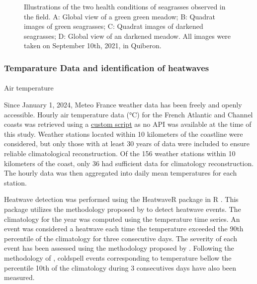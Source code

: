 \documentclass[
  number]{elsarticle}
\makeatletter
\let\oldparagraph\paragraph
\renewcommand{\paragraph}{
    \@ifstar
      \xxxParagraphStar
      \xxxParagraphNoStar
  }
\newcommand{\xxxParagraphStar}[1]{\oldparagraph*{#1}\mbox{}}
\newcommand{\xxxParagraphNoStar}[1]{\oldparagraph{#1}\mbox{}}
\makeatother
\begin{document}
\label{cell-fig-QuiberonImg}
\begin{figure}[H]


\caption{\label{fig-QuiberonImg}Illustrations of the two health
conditions of seagrasses observed in the field. A: Global view of a
green green meadow; B: Quadrat images of green seagrasses; C: Quadrat
images of darkened seagrasses; D: Global view of an darkened meadow. All
images were taken on September 10th, 2021, in Quiberon.}

\end{figure}%

\subsubsection{Temparature Data and identification of
heatwaves}\label{temparature-data-and-identification-of-heatwaves}

\paragraph{Air temperature}\label{air-temperature}

Since January 1, 2024, Meteo France weather data has been freely and
openly accessible. Hourly air temperature data (°C) for the French
Atlantic and Channel coasts was retrieved using a
\href{https://github.com/SigOiry/HeatWave_Seagrasses/blob/main/Scripts/MeteoFrance_Extraction.qmd}{custom
script} as no API was available at the time of this study. Weather
stations located within 10 kilometers of the coastline were considered,
but only those with at least 30 years of data were included to ensure
reliable climatological reconstruction. Of the 156 weather stations
within 10 kilometers of the coast, only 36 had sufficient data for
climatology reconstruction. The hourly data was then aggregated into
daily mean temperatures for each station.

Heatwave detection was performed using the HeatwaveR package in R
\citep{heatwaveR}. This package utilizes the methodology proposed by
\citep{hobday2016hierarchical} to detect heatwave events. The
climatology for the year was computed using the temperature time series.
An event was considered a heatwave each time the temperature exceeded
the 90th percentile of the climatology for three consecutive days. The
severity of each event has been assessed using the methodology proposed
by \citep{hobday2018categorizing}. Following the methodology of
\citep{schlegel2017nearshore}, coldspell events corresponding to
temperature bellow the percentile 10th of the climatology during 3
consecutives days have also been measured.
\end{document}
